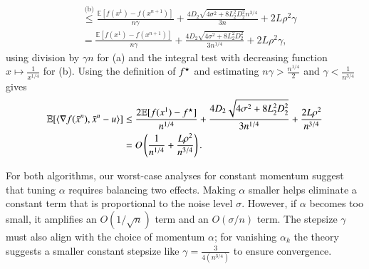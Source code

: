 \begin{appendixproof}
\begin{equation*}
\begin{aligned}
                &\stackrel{\text{(b)}}{\leq} \frac{\mathbb{E}[f(x^1) - f(x^{n+1})]}{n\gamma} + \frac{4D_2\sqrt{4\sigma^2+8L_2^2D_2^2}n^{3/4}}{3n} + 2L\rho^2\gamma\\
                &= \frac{\mathbb{E}[f(x^1) - f(x^{n+1})]}{n\gamma} + \frac{4D_2\sqrt{4\sigma^2+8L_2^2D_2^2}}{3n^{1/4}} + 2L\rho^2\gamma,
        \end{aligned}
    \end{equation*}
    using division by $\gamma n$ for (a) and the integral test with decreasing function $x\mapsto \frac{1}{x^{1/4}}$ for (b).
    Using the definition of $f^\star$ and estimating $n\gamma > \tfrac{n^{1/4}}{2}$ and $\gamma < \frac{1}{n^{3/4}}$ gives
    \begin{equation*}
        \begin{aligned}
            \mathbb{E}[\langle \nabla f(\bar{x}^n),\bar{x}^n-u\rangle]
                &\leq \frac{2\mathbb{E}[f(x^1) - f^\star]}{n^{1/4}} + \frac{4D_2\sqrt{4\sigma^2+8L_2^2D_2^2}}{3n^{1/4}} + \frac{2L\rho^2}{n^{3/4}}\\
                &= O\left(\frac{1}{n^{1/4}} + \frac{L\rho^2}{n^{3/4}}\right).
        \end{aligned}
    \end{equation*}
\end{appendixproof}
\begin{insightbox}[label={insight:convergence}]
For both algorithms, our worst-case analyses for constant momentum suggest that tuning $\alpha$ requires balancing two effects. Making $\alpha$ smaller helps eliminate a constant term that is proportional to the noise level $\sigma$. However, if $\alpha$ becomes too small, it amplifies an $O(1/\sqrt{n})$ term and an $O(\sigma/n)$ term. The stepsize $\gamma$ must also align with the choice of momentum $\alpha$; for vanishing $\alpha_k$ the theory suggests a smaller constant stepsize like $\gamma=\tfrac{3}{4(n^{3/4})}$ to ensure convergence.
\end{insightbox}
